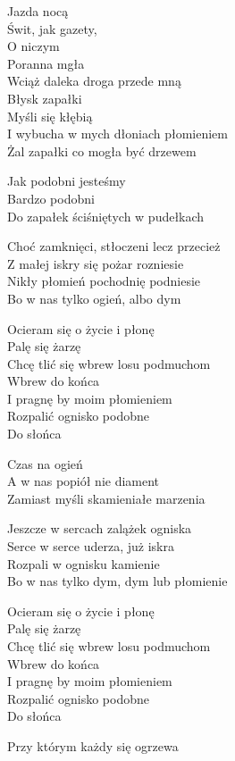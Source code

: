 \begin{text}
    Jazda nocą\\
    Świt, jak gazety,\\
    O niczym\\
    Poranna mgła\\
    Wciąż daleka droga przede mną\\
    Błysk zapałki\\
    Myśli się kłębią\\
    I wybucha w mych dłoniach płomieniem\\
    Żal zapałki co mogła być drzewem

    Jak podobni jesteśmy\\
    Bardzo podobni\\
    Do zapałek ściśniętych w pudełkach

    Choć zamknięci, stłoczeni lecz przecież\\
    Z małej iskry się pożar rozniesie\\
    Nikły płomień pochodnię podniesie\\
    Bo w nas tylko ogień, albo dym

    Ocieram się o życie i płonę\\
    Palę się żarzę\\
    Chcę tlić się wbrew losu podmuchom\\
    Wbrew do końca\\
    I pragnę by moim płomieniem\\
    Rozpalić ognisko podobne\\
    Do słońca

    Czas na ogień\\
    A w nas popiół nie diament\\
    Zamiast myśli skamieniałe marzenia

    Jeszcze w sercach zalążek ogniska\\
    Serce w serce uderza, już iskra\\
    Rozpali w ognisku kamienie\\
    Bo w nas tylko dym, dym lub płomienie

    Ocieram się o życie i płonę\\
    Palę się żarzę\\
    Chcę tlić się wbrew losu podmuchom\\
    Wbrew do końca\\
    I pragnę by moim płomieniem\\
    Rozpalić ognisko podobne\\
    Do słońca

    Przy którym każdy się ogrzewa
\end{text}
\begin{chord}

\end{chord}